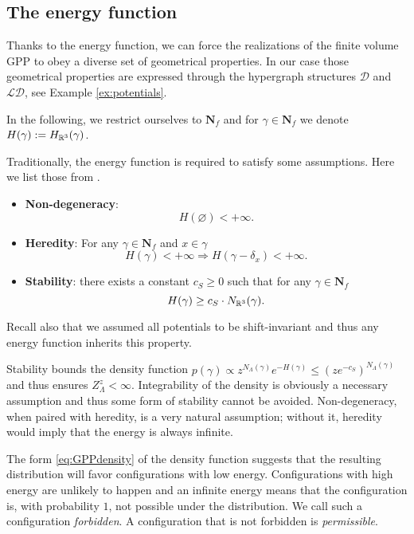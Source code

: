 \subsection{The energy function}\label{sec:energyfunction}

Thanks to the energy function, we can force the realizations of the finite volume GPP to obey a diverse set of geometrical properties. In our case those geometrical properties are expressed through the hypergraph structures $\mathcal D$ and $\mathcal {LD}$, see Example \ref{ex:potentials}. \newline

In the following, we restrict ourselves to $\mathbf N_f$ and for $\gamma \in \mathbf N_f$ we denote $H(\gamma):= H_{\mathbb R^3}(\gamma)$.\newline 

\noindent Traditionally, the energy function is required to satisfy some assumptions. Here we list those from \cite{Dereudre2017}. 
\begin{itemize}
	\item \textbf{Non-degeneracy}:
		$$H(\varnothing) < +\infty.$$
	\item \textbf{Heredity}: For any $\gamma \in \mathbf N_f$ and $x\in \gamma$
		$$H(\gamma)< + \infty \Rightarrow H(\gamma - \delta_x) < +\infty.$$
	\item \textbf{Stability}: there exists a constant $c_S\geq 0$ such that for any $\gamma \in \mathbf N_f$
		$$H(\gamma) \geq c_S\cdot N_{\mathbb R^3} (\gamma).$$
\end{itemize}
Recall also that we assumed all potentials to be shift-invariant and thus any energy function inherits this property.\newline

Stability bounds the density function $p(\gamma) \propto z^{N_\Lambda( \gamma)}e^{-H(\gamma)} \leq (z e^{-c_S})^{N_\Lambda(\gamma)} $ and thus ensures $Z^z_\Lambda < \infty$. Integrability of the density is obviously a necessary assumption and thus some form of stability cannot be avoided. 
Non-degeneracy, when paired with heredity, is a very natural assumption; without it, heredity would imply that the energy is always infinite.\newline

The form \eqref{eq:GPPdensity} of the density function suggests that the resulting distribution will favor configurations with low energy. Configurations with high energy are unlikely to happen and an infinite energy means that the configuration is, with probability $1$, not possible under the distribution. We call such a configuration \textit{forbidden}. A configuration that is not forbidden is \textit{permissible}.  \newline

